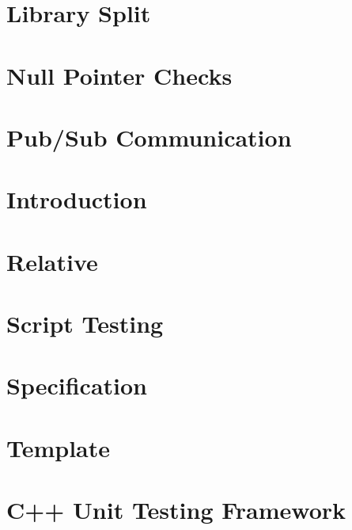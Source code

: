 \documentclass[twoside]{book}
\newcommand{\+}{\discretionary{\mbox{\scriptsize$\hookleftarrow$}}{}{}}
\begin{document}
\chapter{Library Split}
\label{doc_decisions_library_split_md}
\hypertarget{doc_decisions_library_split_md}{}

\chapter{Null Pointer Checks}
\label{doc_decisions_null_pointer_checks_md}
\hypertarget{doc_decisions_null_pointer_checks_md}{}

\chapter{Pub/\+Sub Communication}
\label{doc_decisions_pubsub_md}
\hypertarget{doc_decisions_pubsub_md}{}

\chapter{Introduction}
\label{doc_decisions_README_md}
\hypertarget{doc_decisions_README_md}{}

\chapter{Relative}
\label{doc_decisions_relative_md}
\hypertarget{doc_decisions_relative_md}{}

\chapter{Script Testing}
\label{doc_decisions_script_testing_md}
\hypertarget{doc_decisions_script_testing_md}{}

\chapter{Specification}
\label{doc_decisions_specification_md}
\hypertarget{doc_decisions_specification_md}{}

\chapter{Template}
\label{doc_decisions_template_md}
\hypertarget{doc_decisions_template_md}{}

\chapter{C++ Unit Testing Framework}
\label{doc_decisions_unit_testing_md}
\hypertarget{doc_decisions_unit_testing_md}{}

\end{document}
